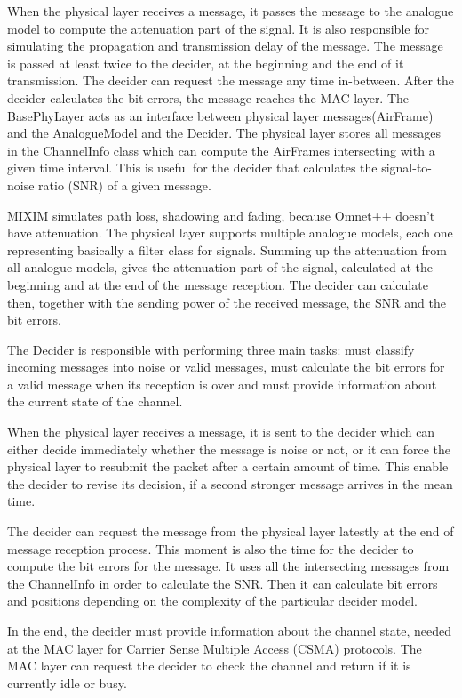When the physical layer receives a message, it passes the message to the
analogue model to compute the attenuation part of the signal. It is
also responsible for simulating the propagation and transmission delay of the
message. The message is passed at least twice to the decider, at the beginning
and the end of it transmission. The decider can request the message any time
in-between. After the decider calculates the bit errors, the message reaches the
MAC layer. The BasePhyLayer acts as an interface between physical layer
messages(AirFrame) and the AnalogueModel and the Decider. The physical layer
stores all messages in the ChannelInfo class which can compute the AirFrames
intersecting with a given time interval. This is useful for the decider that
calculates the signal-to-noise ratio (SNR) of a given message.

MIXIM simulates path loss, shadowing and fading, because Omnet++ doesn't have
attenuation. The physical layer supports multiple analogue models, each one
representing basically a filter class for signals. Summing up the attenuation
from all analogue models, gives the attenuation part of the signal, calculated
at the beginning and at the end of the message reception. The decider can
calculate then, together with the sending power of the received message, the SNR
and the bit errors.

The Decider is responsible with performing three main tasks: must classify
incoming messages into noise or valid messages, must calculate the bit errors
for a valid message when its reception is over and must provide information
about the current state of the channel.

When the physical layer receives a message, it is sent to the decider which can
either decide immediately whether the message is noise or not, or it can force
the physical layer to resubmit the packet after a certain amount of time. This
enable the decider to revise its decision, if a second stronger message arrives
in the mean time.

The decider can request the message from the physical layer latestly at the end
of message reception process. This moment is also the time for the decider to
compute the bit errors for the message. It uses all the intersecting messages
from the ChannelInfo in order to calculate the SNR. Then it can calculate bit
errors and positions depending on the complexity of the particular decider
model.

In the end, the decider must provide information about the channel state, needed
at the MAC layer for Carrier Sense Multiple Access (CSMA) protocols. The MAC
layer can request the decider to check the channel and return if it is currently
idle or busy.
